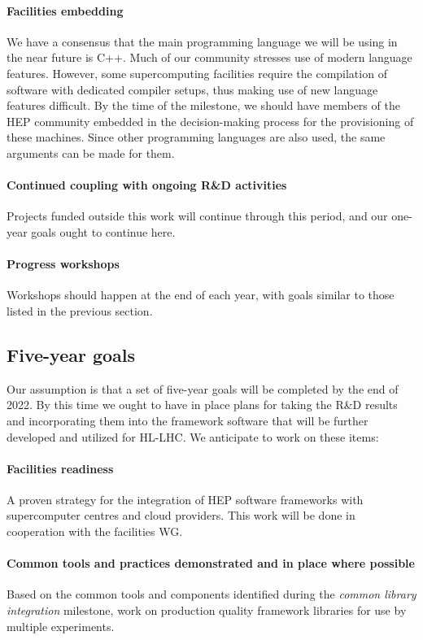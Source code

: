 \documentclass[12pt,a4paper]{article}
\begin{document}
\paragraph{Facilities embedding} We have a consensus that the main
programming language we will be using in the near future is C++.  Much
of our community stresses use of modern language features. However,
some supercomputing facilities require the compilation of software
with dedicated compiler setups, thus making use of new language
features difficult. By the time of the milestone, we should have
members of the HEP community embedded in the decision-making process
for the provisioning of these machines. Since other programming
languages are also used, the same arguments can be made for them.

\paragraph{Continued coupling with ongoing R\&D activities} Projects
funded outside this work will continue through this period, and our
one-year goals ought to continue here.

\paragraph{Progress workshops} Workshops should happen at the end of
each year, with goals similar to those listed in the previous section.

\subsection{Five-year goals}
\label{sec:five-year-goals}

Our assumption is that a set of five-year goals will be completed by
the end of 2022. By this time we ought to have in place plans for
taking the R\&D results and incorporating them into the framework
software that will be further developed and utilized for HL-LHC. We
anticipate to work on these items:

\paragraph{Facilities readiness} A proven strategy for the integration
of HEP software frameworks with supercomputer centres and cloud
providers.  This work will be done in cooperation with the facilities
WG.

\paragraph{Common tools and practices demonstrated and in place where
  possible} Based on the common tools and components identified during
the \emph{common library integration} milestone, work on production
quality framework libraries for use by multiple experiments.
\end{document}
